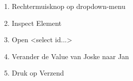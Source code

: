 \begin{enumerate}
  \item Rechtermuisknop op dropdown-menu
  \item Inspect Element
  \item Open <select id...>
  \item Verander de Value van Joske naar Jan
  \item Druk op Verzend
\end{enumerate}
